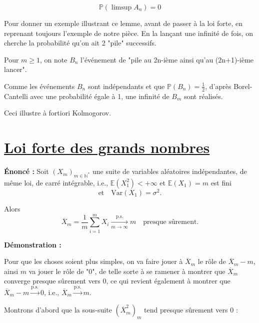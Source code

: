 \documentclass{article}
\begin{document}
\[
\mathbb{P}(\limsup A_n) = 0
\]

\vspace{0.1cm}
\noindent
Pour donner un exemple illustrant ce lemme, avant de passer à la loi forte, en reprenant toujours l'exemple de notre pièce. En la lançant une infinité de fois, on cherche la probabilité qu'on ait 2 "pile" successifs.

\vspace{0.3cm}
\noindent
Pour $m \geq 1$, on note $B_n$ l'événement de "pile au 2n-ième ainsi qu'au (2n+1)-ième lancer".


\noindent
Comme les événements $B_n$ sont indépendants et que $\mathbb{P}(B_n) = \frac{1}{2}$, d'après Borel-Cantelli avec une probabilité égale à 1, une infinité de $B_m$ sont réalisés.

\vspace{0.3cm}
\noindent
Ceci illustre à fortiori Kolmogorov.

\vspace{1cm}

\section*{\underline{Loi forte des grands nombres}}


\textbf{Énoncé :} Soit $(X_m)_{m \in \mathbb{N}^*}$ une suite de variables aléatoires indépendantes, de même loi, de carré intégrable, i.e., $\mathbb{E}(X_1^2) < +\infty$ et $\mathbb{E}(X_1) = m$ est fini  
\[
\text{et} \quad \text{Var}(X_1) = \sigma^2.
\]

Alors 
\[
\overline{X}_m = \frac{1}{m} \sum_{i=1}^m X_i \xrightarrow[m \to \infty]{\text{p.s.}} m \quad \text{presque sûrement}.
\]

\vspace{0.8cm}
\noindent
\textbf{Démonstration :}
\vspace{0.5cm}

\noindent
Pour que les choses soient plus simples, on va faire jouer à $\overline{X}_m$ le rôle de $\overline{X}_m - m$, ainsi $m$ va jouer le rôle de "0", de telle sorte à se ramener à montrer que 
$\overline{X}_m$ converge presque sûrement vers 0, ce qui revient également à montrer que $\overline{X}_m - m \xrightarrow{\text{p.s.}} 0$, i.e., $\overline{X}_m \xrightarrow{\text{p.s.}} m$.



\vspace{0.5cm}
\noindent
Montrons d'abord que la sous-suite $(\overline{X}_m^2)_m$ tend presque sûrement vers 0 :
\end{document}

